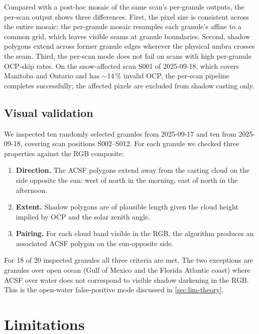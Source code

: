 \documentclass[11pt,a4paper]{article}
\begin{document}
Compared with a post-hoc mosaic of the same scan's per-granule outputs,
the per-scan output shows three differences. First, the pixel size is
consistent across the entire mosaic; the per-granule mosaic resamples
each granule's affine to a common grid, which leaves visible seams at
granule boundaries. Second, shadow polygons extend across former
granule edges wherever the physical umbra crosses the seam. Third, the
per-scan mode does not fail on scans with high per-granule OCP-skip
rates. On the snow-affected scan S001 of 2025-09-18, which covers
Manitoba and Ontario and has $\sim$14\,\% invalid OCP, the per-scan
pipeline completes successfully; the affected pixels are excluded from
shadow casting only.

\subsection{Visual validation}\label{sec:res-validation}

We inspected ten randomly selected granules from 2025-09-17 and ten
from 2025-09-18, covering scan positions S002--S012. For each granule
we checked three properties against the RGB composite:

\begin{enumerate}
  \item \textbf{Direction.} The ACSF polygons extend away from the
        casting cloud on the side opposite the sun: west of north in
        the morning, east of north in the afternoon.
  \item \textbf{Extent.} Shadow polygons are of plausible length given
        the cloud height implied by OCP and the solar zenith angle.
  \item \textbf{Pairing.} For each cloud band visible in the RGB,
        the algorithm produces an associated ACSF polygon on the
        sun-opposite side.
\end{enumerate}

For 18 of 20 inspected granules all three criteria are met. The two
exceptions are granules over open ocean (Gulf of Mexico and the
Florida Atlantic coast) where ACSF over water does not correspond to
visible shadow darkening in the RGB. This is the open-water
false-positive mode discussed in \cref{sec:lim-theory}.

\section{Limitations}\label{sec:limitations}
\end{document}
